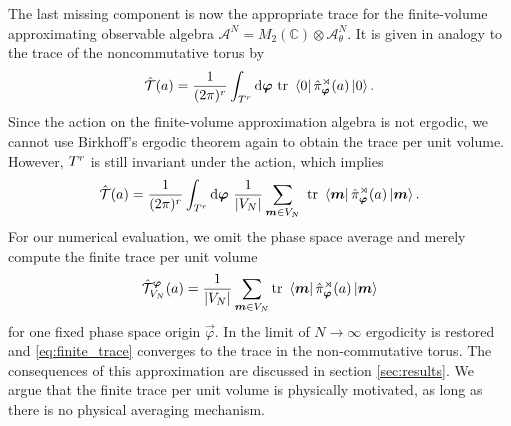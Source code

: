 \documentclass[submission, Phys]{SciPost}
\begin{document}
The last missing component is now the appropriate trace for the finite-volume approximating observable algebra $\mathcal{A}^N=M_2(\mathbb{C})\otimes\mathcal{A}_\theta^N$. It is given in analogy to the trace of the noncommutative torus by \cite[Prop 4.26]{Prodan2017}
\begin{equation}
    \hat{\mathcal{T}}(a) = \frac{1}{(2\pi)^{r}} \int_{T^r}\mathrm{d} \boldsymbol{\varphi} ~ \mathrm{tr}~ \bra{0} \hat{\pi}^\rtimes_{ \boldsymbol{\varphi}}(a) \ket{0}.
\end{equation}
Since the action on the finite-volume approximation algebra is not ergodic, we cannot use Birkhoff's ergodic theorem again to obtain the trace per unit volume. However, $T^r$ is still invariant under the action, which implies
\begin{equation}
    \hat{\mathcal{T}}(a) = \frac{1}{(2\pi)^{r}} \int_{T^r}\mathrm{d} \boldsymbol{\varphi} ~  \frac{1}{|V_N|} \sum_{\boldsymbol{m} \in V_N} ~ \mathrm{tr}~ \bra{\boldsymbol{m}} \hat{\pi}^\rtimes_{ \boldsymbol{\varphi}}(a) \ket{\boldsymbol{m}}.
\end{equation}
For our numerical evaluation, we omit the phase space average and merely compute the finite trace per unit volume
\begin{equation}
    \hat{\mathcal{T}}^{\boldsymbol{\varphi}}_{V_N}(a)= \frac{1}{|V_N|} \sum_{\boldsymbol{m} \in V_N} \mathrm{tr}~ \bra{\boldsymbol{m}} \hat{\pi}^\rtimes_{\boldsymbol{\varphi}}(a) \ket{\boldsymbol{m}}
    \label{eq:finite_trace}
\end{equation}
for one fixed phase space origin $\vec{\varphi}$. 
In the limit of $N\to \infty$ ergodicity is restored and \eqref{eq:finite_trace} converges to the trace in the non-commutative torus.
The consequences of this approximation are discussed in section \ref{sec:results}. 
We argue that the finite trace per unit volume is physically motivated, as long as there is no physical averaging mechanism.
\end{document}
